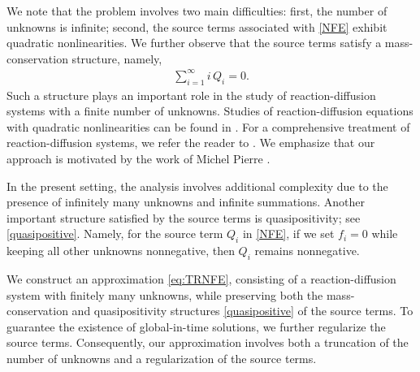 \documentclass[a4paper,12pt,reqno]{amsart}
\theoremstyle{plain}
\numberwithin{equation}{section}
\begin{document}
	We note that the problem involves two main difficulties: first, the number of unknowns is infinite; second, the source terms associated with \eqref{NFE} exhibit quadratic nonlinearities. We further observe that the source terms satisfy a mass-conservation structure, namely,
	\begin{align}\label{mass conservation NCF}
		\sum_{i=1}^{\infty} i \, Q_i = 0 .
	\end{align}
	Such a structure plays an important role in the study of reaction-diffusion systems with a finite number of unknowns. Studies of reaction-diffusion equations with quadratic nonlinearities can be found in \cite{pierre2003weak, Pierre2010}. For a comprehensive treatment of reaction-diffusion systems, we refer the reader to \cite{canizo2014improved, desvillettes2015duality, desvillettes2007global, fitzgibbon2021reaction, fellner2021uniform, das2025existence}. We emphasize that our approach is motivated by the work of Michel Pierre \cite{Pierre2010}. 
	
	In the present setting, the analysis involves additional complexity due to the presence of infinitely many unknowns and infinite summations. Another important structure satisfied by the source terms is quasipositivity; see \eqref{quasipositive}. Namely, for the source term $Q_i$ in \eqref{NFE}, if we set $f_i = 0$ while keeping all other unknowns nonnegative, then $Q_i$ remains nonnegative.
	
	We construct an approximation \eqref{eq:TRNFE}, consisting of a reaction-diffusion system with finitely many unknowns, while preserving both the mass-conservation and quasipositivity structures \eqref{quasipositive} of the source terms. To guarantee the existence of global-in-time solutions, we further regularize the source terms. Consequently, our approximation involves both a truncation of the number of unknowns and a regularization of the source terms.
	
\end{document}
